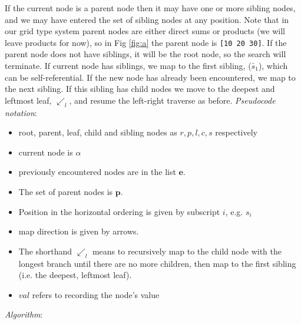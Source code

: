 \documentclass[11pt]{article}
\begin{document}
If the current node is a parent node then it may have one or more sibling nodes, and we may have entered the set of sibling nodes at any position. Note that in our grid type system parent nodes are either direct sums or products (we will leave products for now), so in Fig \ref{fig:a} the parent node is \texttt{[10 20 30]}. If the parent node does not have siblings, it will be the root node, so the search will terminate. If current node has siblings, we map to the first sibling, ($\overleftarrow{s_1}$), which can be self-referential. If the new node has already been encountered, we map to the next sibling. If this sibling has child nodes we move to the deepest and leftmost leaf, $\swarrow_l$, and resume the left-right traverse as before.
\newline
\newline
\textit{Pseudocode notation}:
\begin{itemize}
	\item root, parent, leaf, child and sibling nodes as $r, p, l, c, s$ respectively
	\item current node is $\alpha$
	\item previously encountered nodes are in the list $\mathbf{e}$. 
	\item The set of parent nodes is $\mathbf{p}$.
	\item Position in the horizontal ordering is given by subscript $i$, e.g. $s_i$
	\item map direction is given by arrows.
	\item The shorthand $\swarrow_l$ means to recursively map to the child node with the longest branch until there are no more children, then map to the first sibling (i.e. the deepest, leftmost leaf). 
	\item $val$ refers to recording the node's value
\end{itemize}

\textit{Algorithm}: 
\end{document}
